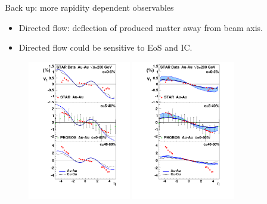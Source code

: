 \documentclass[11pt]{beamer}
\begin{document}
\begin{frame}[noframenumbering]{Back up: more rapidity dependent observables}
\begin{itemize}
\item Directed flow: deflection of produced matter away from beam axis.
\item Directed flow could be sensitive to EoS and IC.
\end{itemize}
\begin{center}
\begin{figure}
\includegraphics[width=0.4\textwidth]{./pics/Pitor-0.png}
\includegraphics[width=0.4\textwidth]{./pics/Pitor-1.png}
\end{figure}
\end{center}
\end{frame}
\end{document}
